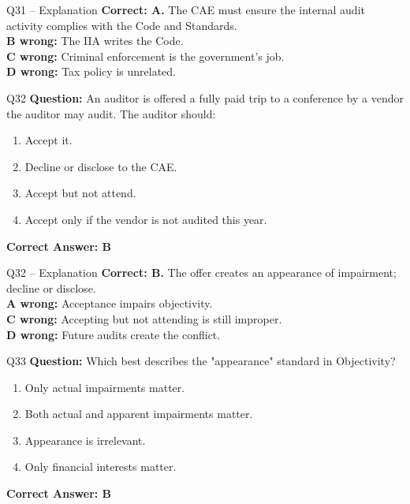 \documentclass[aspectratio=169,10pt]{beamer}
\begin{document}
	\begin{frame}[t]{Q31 -- Explanation}
		\small
		\textbf{Correct: A.} The CAE must ensure the internal audit activity complies with the Code and Standards. \\[4pt]
		\textbf{B wrong:} The IIA writes the Code. \\[2pt]
		\textbf{C wrong:} Criminal enforcement is the government's job. \\[2pt]
		\textbf{D wrong:} Tax policy is unrelated.
	\end{frame}
	
	\begin{frame}[t]{Q32}
		\small
		\textbf{Question:} An auditor is offered a fully paid trip to a conference by a vendor the auditor may audit. The auditor should:
		\begin{enumerate}[label=\Alph*.,itemsep=1pt,topsep=2pt]
			\item Accept it.
			\item Decline or disclose to the CAE.
			\item Accept but not attend.
			\item Accept only if the vendor is not audited this year.
		\end{enumerate}
		\vspace{4pt}
		\textbf{Correct Answer: B}
	\end{frame}
	
	\begin{frame}[t]{Q32 -- Explanation}
		\small
		\textbf{Correct: B.} The offer creates an appearance of impairment; decline or disclose. \\[4pt]
		\textbf{A wrong:} Acceptance impairs objectivity. \\[2pt]
		\textbf{C wrong:} Accepting but not attending is still improper. \\[2pt]
		\textbf{D wrong:} Future audits create the conflict.
	\end{frame}
	
	\begin{frame}[t]{Q33}
		\small
		\textbf{Question:} Which best describes the "appearance" standard in Objectivity?
		\begin{enumerate}[label=\Alph*.,itemsep=1pt,topsep=2pt]
			\item Only actual impairments matter.
			\item Both actual and apparent impairments matter.
			\item Appearance is irrelevant.
			\item Only financial interests matter.
		\end{enumerate}
		\vspace{4pt}
		\textbf{Correct Answer: B}
	\end{frame}
	
\end{document}
